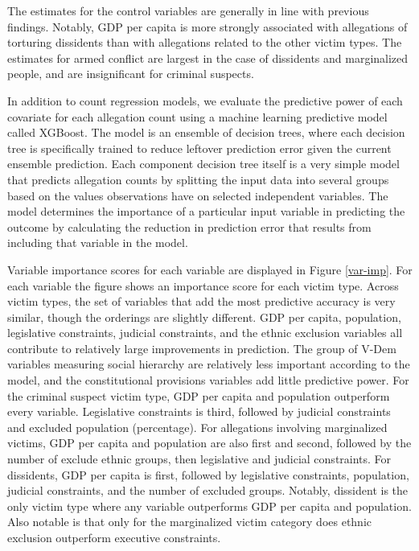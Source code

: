 \documentclass[11pt]{article}
\begin{document}
The estimates for the control variables are generally in line with previous findings. Notably, GDP per capita is more strongly associated with allegations of torturing dissidents than with allegations related to the other victim types. The estimates for armed conflict are largest in the case of dissidents and marginalized people, and are insignificant for criminal suspects. 

In addition to count regression models, we evaluate the predictive power of each covariate for each allegation count using a machine learning predictive model called XGBoost. The model is an ensemble of decision trees, where each decision tree is specifically trained to reduce leftover prediction error given the current ensemble prediction. Each component decision tree itself is a very simple model that predicts allegation counts by splitting the input data into several groups based on the values observations have on selected independent variables. The model determines the importance of a particular input variable in predicting the outcome by calculating the reduction in prediction error that results from including that variable in the model. 

Variable importance scores for each variable are displayed in Figure \ref{var-imp}. For each variable the figure shows an importance score for each victim type. Across victim types, the set of variables that add the most predictive accuracy is very similar, though the orderings are slightly different. GDP per capita, population, legislative constraints, judicial constraints, and the ethnic exclusion variables all contribute to relatively large improvements in prediction. The group of V-Dem variables measuring social hierarchy are relatively less important according to the model, and the constitutional provisions variables add little predictive power. For the criminal suspect victim type, GDP per capita and population outperform every variable. Legislative constraints is third, followed by judicial constraints and excluded population (percentage). For allegations involving  marginalized victims, GDP per capita and population are also first and second, followed by the number of exclude ethnic groups, then legislative and judicial constraints. For dissidents, GDP per capita is first, followed by legislative constraints, population, judicial constraints, and the number of excluded groups. Notably, dissident is the only victim type where any variable outperforms GDP per capita and population. Also notable is that only for the marginalized victim category does ethnic exclusion outperform executive constraints. 
\end{document}
